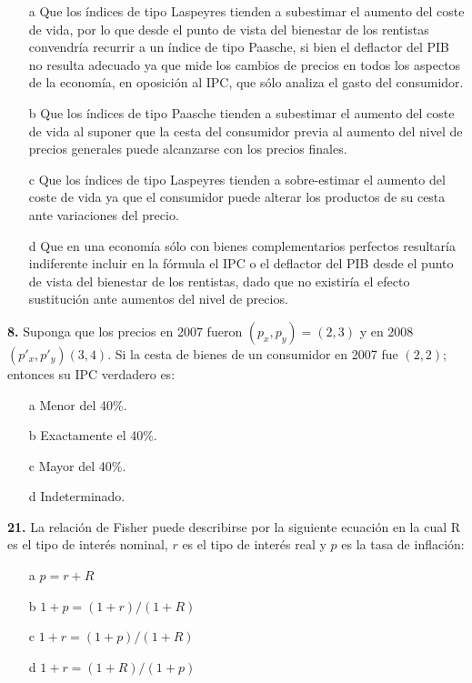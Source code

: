 \documentclass{nuevotema}
\begin{document}
\begin{itemize}
	\item[a] Que los índices de tipo Laspeyres tienden a subestimar el aumento del coste de vida, por lo que desde el punto de vista del bienestar de los rentistas convendría recurrir a un índice de tipo Paasche, si bien el deflactor del PIB no resulta adecuado ya que mide los cambios de precios en todos los aspectos de la economía, en oposición al IPC, que sólo analiza el gasto del consumidor.
	\item[b] Que los índices de tipo Paasche tienden a subestimar el aumento del coste de vida al suponer que la cesta del consumidor previa al aumento del nivel de precios generales puede alcanzarse con los precios finales.
	\item[c] Que los índices de tipo Laspeyres tienden a sobre-estimar el aumento del coste de vida ya que el consumidor puede alterar los productos de su cesta ante variaciones del precio.
	\item[d] Que en una economía sólo con bienes complementarios perfectos resultaría indiferente incluir en la fórmula el IPC o el deflactor del PIB desde el punto de vista del bienestar de los rentistas, dado que no existiría el efecto sustitución ante aumentos del nivel de precios.
\end{itemize}


\textbf{8.} Suponga que los precios en 2007 fueron $(p_x, p_y) = (2,3)$ y en 2008 $(p'_x, p'_y) (3,4)$. Si la cesta de bienes de un consumidor en 2007 fue $(2,2)$; entonces su IPC verdadero es:

\begin{itemize}
	\item[a] Menor del 40\%.
	\item[b] Exactamente el 40\%.
	\item[c] Mayor del 40\%.
	\item[d] Indeterminado.
\end{itemize}


\textbf{21.} La relación de Fisher puede describirse por la siguiente ecuación en la cual R es el tipo de interés nominal, $r$ es el tipo de interés real y $p$ es la tasa de inflación:

\begin{itemize}
	\item[a] $p=r+R$
	\item[b] $1+p = (1+r)/(1+R)$
	\item[c] $1+r = (1+p)/(1+R)$
	\item[d] $1+r = (1+R)/(1+p)$
\end{itemize}
\end{document}
